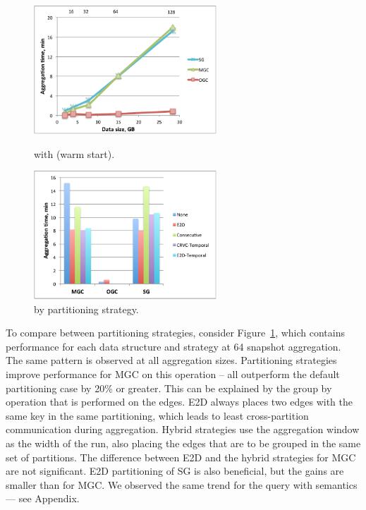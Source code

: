 \begin{figure}[t!]
\centering
\begin{minipage}{3in}
  \centering
  \includegraphics[width=2.7in]{figs/tgroupe_warm.pdf}
\vspace{-0.1in}
  \caption{ with  (warm start).}
  \label{fig:tgroupe}
\vspace{-0.1in}
\end{minipage}
\begin{minipage}{3in}
  \centering
  \includegraphics[width=2.7in]{figs/tgroupeparts.pdf}
\vspace{-0.1in}
  \caption{ by partitioning strategy.}
  \label{fig:tgroupeparts}
\vspace{-0.1in}
\end{minipage}
\end{figure}

To compare between partitioning strategies, consider
Figure~\ref{fig:tgroupeparts}, which contains performance for each
data structure and strategy at 64 snapshot aggregation.  The same
pattern is observed at all aggregation sizes.  Partitioning strategies
improve performance for MGC on this operation -- all outperform the
default partitioning case by 20\% or greater.  This can be explained
by the group by operation that is performed on the edges.  E2D always
places two edges with the same key in the same partitioning, which
leads to least cross-partition communication during aggregation.
Hybrid strategies use the aggregation window as the width of the run,
also placing the edges that are to be grouped in the same set of
partitions.  The difference between E2D and the hybrid strategies for
MGC are not significant.  E2D partitioning of SG is also beneficial,
but the gains are smaller than for MGC.  We observed the same trend
for the  query with  semantics --- see
Appendix.

